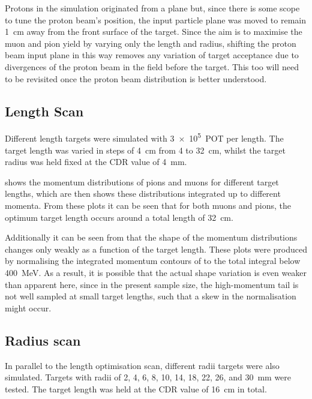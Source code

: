 Protons in the simulation originated from a plane but, since there is some scope to tune the proton
beam's position, the input particle plane was moved to remain 1~cm away from
the front surface of the target.  Since the aim is to maximise the muon and
pion yield by varying only the length and radius, shifting the proton beam
input plane in this way removes any variation of target acceptance due to
divergences of the proton beam in the field before the target.
This too will need to be revisited once the proton beam distribution is better understood.

\subsection{Length Scan}
Different length targets were simulated with \num{3e5}~\ac{POT} per length.
The target length was varied in steps of 4~cm from 4 to 32~cm, whilst the target radius was held fixed at the CDR value of 4~mm.

 shows the momentum distributions of pions and muons for different target lengths, which are 
 then shows these distributions integrated up to different momenta.
From these plots it can be seen that for both muons and pions, the optimum target length occurs around a total length of 32~cm.

Additionally it can be seen from
 that the shape of the
momentum distributions changes only weakly as a function of the target length.
These plots were produced by normalising the integrated momentum contours of
 to the total integral below
400~MeV.  As a result, it is possible that the actual shape variation is even
weaker than apparent here, since in the present sample size, the high-momentum
tail is not well sampled at small target lengths, such that a skew in the
normalisation might occur.

\FigOptimProdTgtLength
\FigOptimProdTgtRad
\subsection{Radius scan}
In parallel to the length optimisation scan, different radii targets were also simulated.
Targets with radii of 2, 4, 6, 8, 10, 14, 18, 22, 26, and 30~mm were tested.
The target length was held at the \ac{CDR} value of 16~cm in total.

